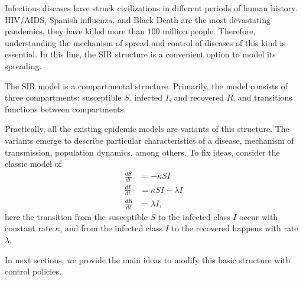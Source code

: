  Infectious diseases have struck civilizations in different periods of human history.  HIV/AIDS, Spanish influenza, and
Black Death are the most devastating pandemics, they have
killed more than 100 million people. Therefore, understanding the mechanism of
spread and control of diseases of this kind is essential.
In this line, the SIR structure is a convenient option to model its 
spreading. 

  The SIR model is a compartmental structure. Primarily, the model consists of 
three compartments: susceptible $S$, infected $I$, and recovered $R$, %
 and transitions functions between compartments.

  Practically, all the existing epidemic models are variants of this structure. 
The variants emerge to describe particular characteristics of a disease, 
mechanism of transmission, population dynamics, among others. 
To fix ideas, consider the classic model of 
\citet{Kermac}
\begin{equation}
  \begin{aligned}
    \frac{dS}{dt} & = - \kappa SI
      \\
    \frac{dI}{dt} & = \kappa SI - \lambda I
      \\
    \frac{dR}{dt} & = \lambda I,
  \end{aligned}
\end{equation}
here the transition from the susceptible $S$ to the infected class $I$ 
occur with constant rate $\kappa$, and from  the infected class $I$ to the 
recovered happens with rate $\lambda$.

In next sections, we provide the main ideas to modify this 
basic structure with control policies.